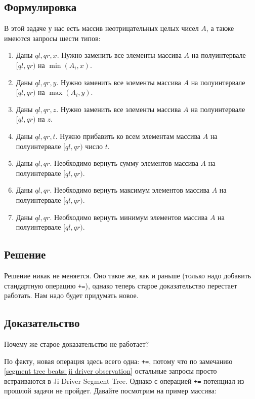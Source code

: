 \subsection{Формулировка}

В этой задаче у нас есть массив неотрицательных целых чисел $A$, а также имеются запросы шести типов:

\begin{enumerate}
    \item Даны $ql, qr, x$. Нужно заменить все элементы массива $A$ на полуинтервале $[ql, qr)$ на $\min(A_i, x)$.
    \item Даны $ql, qr, y$. Нужно заменить все элементы массива $A$ на полуинтервале $[ql, qr)$ на $\max(A_i, y)$.
    \item Даны $ql, qr, z$. Нужно заменить все элементы массива $A$ на полуинтервале $[ql, qr)$ на $z$.
    \item Даны $ql, qr, t$. Нужно прибавить ко всем элементам массива $A$ на полуинтервале $[ql, qr)$ число $t$.
    \item Даны $ql, qr$. Необходимо вернуть сумму элементов массива $A$ на полуинтервале $[ql, qr)$.
    \item Даны $ql, qr$. Необходимо вернуть максимум элементов массива $A$ на полуинтервале $[ql, qr)$.
    \item Даны $ql, qr$. Необходимо вернуть минимум элементов массива $A$ на полуинтервале $[ql, qr)$.
\end{enumerate}


\subsection{Решение}

Решение никак не меняется. Оно такое же, как и раньше (только надо добавить стандартную операцию \verb^+=^), однако теперь старое доказательство перестает работать. Нам надо будет придумать новое.

\subsection{Доказательство}
Почему же старое доказательство не работает?

По факту, новая операция здесь всего одна: \verb^+=^, потому что по замечанию \ref{segment tree beats: ji driver observation} остальные запросы просто встраиваются в Ji Driver Segment Tree. Однако с операцией \verb^+=^ потенциал из прошлой задачи не пройдет. Давайте посмотрим на пример массива:

